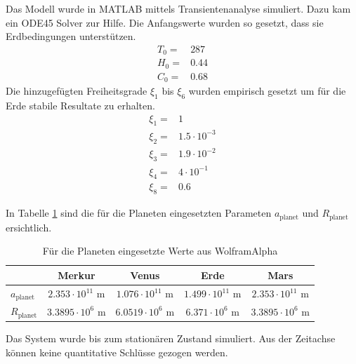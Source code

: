 \begin{refsection}
Das Modell wurde in MATLAB mittels Transientenanalyse simuliert. Dazu kam ein ODE45 Solver zur Hilfe. Die Anfangswerte wurden so gesetzt, dass sie Erdbedingungen unterstützen.  
\begin{equation}
\begin{matrix}
T_0 = & 287 \\
H_0 = & 0.44 \\
C_0 = & 0.68
\end{matrix}
\end{equation}
Die hinzugefügten Freiheitsgrade $\xi_1$ bis $\xi_6$ wurden empirisch gesetzt um für die Erde stabile Resultate zu erhalten.
\begin{equation}
\begin{matrix}
\xi_1 = & 1                 \\
\xi_2 = & 1.5 \cdot 10^{-3} \\
\xi_3 = & 1.9 \cdot 10^{-2} \\
\xi_4 = & 4   \cdot 10^{-1} \\
\xi_8 = & 0.6
\end{matrix}
\end{equation}

In Tabelle \ref{planeten:planetValues} sind die für die Planeten eingesetzten Parameten $a_{\text{planet}}$ und $R_{\text{planet}}$ ersichtlich.
\begin{center}
\begin{table}
	\center
	\begin{tabular}{l|c c c c}
                        & Merkur                    & Venus                    & Erde                    & Mars     \\
  \hline
  $a_{\text{planet}}$   & $2.353 \cdot 10^{11}$ m   & $1.076 \cdot 10^{11}$ m  & $1.499 \cdot 10^{11}$ m & $2.353 \cdot 10^{11}$ m \\
  $R_{\text{planet}}$   & $3.3895 \cdot 10^{6}$ m   & $6.0519 \cdot 10^{6}$ m  & $6.371 \cdot 10^{6}$ m  & $3.3895 \cdot 10^{6}$ m 
\end{tabular}
\caption{Für die Planeten eingesetzte Werte aus WolframAlpha}
\label{planeten:planetValues}
\end{table}
\end{center}





Das System wurde bis zum stationären Zustand simuliert. Aus der Zeitachse können keine quantitative Schlüsse gezogen werden.


\end{refsection}
